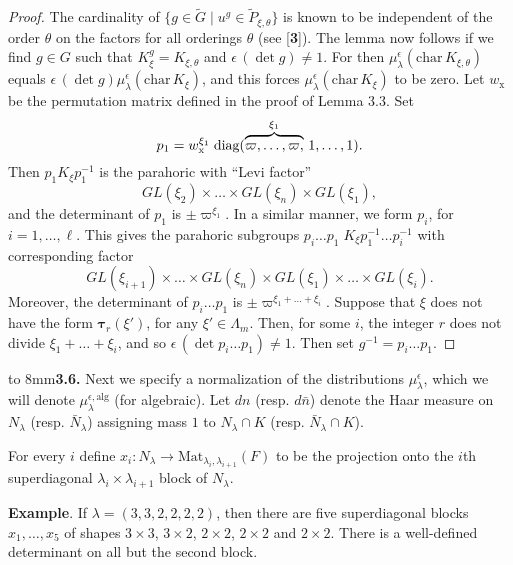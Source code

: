 \documentclass{amsart}
\begin{document}
\begin{proof}
The cardinality of
  $ \{ g \in \tilde G \mid u^g \in \tilde P_{\xi,\theta} \} $
is known to be independent of the order
  $ \theta $
on the factors for all orderings
  $ \theta $ (see [{\bf 3}]).
The lemma now follows if we find 
  $ g \in G $
such that
  $ K_{\xi}^g  = K_{\xi,\theta} $
and
  $ \epsilon \, (\det g) \neq 1 $.
For then 
%
$
   \mu_{\lambda}^{\epsilon} (\text{char}\,K_{\xi,\theta}) $
equals
    $ \epsilon \,(\det g) \mu_{\lambda}^{\epsilon} 
      (\text{char}\, K_{\xi})$, and this forces
    $\mu_{\lambda}^{\epsilon} (\text{char}\, K_{\xi})$ to be zero.
Let
  $ w_{\text{x}} $ be the permutation matrix defined in 
  the proof of Lemma 3.3.
Set
\[ 
  p_1 = w_{\text{x}}^{\xi_1} \; \text{diag} 
     ( 
      \overbrace{\vphantom{1}
         \varpi,\dots , \varpi,}^{\xi_1} \,1,\dots,1).\]
Then
  $ p_1 K_{\xi} p_1^{-1} $
is the parahoric with ``Levi factor''
$$
  GL(\xi_2) \times \dots \times 
  GL(\xi_n) \times
  GL(\xi_1),
$$
%
and the determinant of
  $ p_1 $ is
  $\pm\varpi^{\xi_1} $.
In a similar manner, we form
  $ p_i $,
  for $ i = 1, \dots , \ell $.
This gives the parahoric subgroups
  $ p_i \dots p_1 \;
    K_{\xi}
   p_1^{-1} \dots p_i^{-1} $
with corresponding factor
%
$$
  GL(\xi_{i+1})
  \times \dots \times
  GL(\xi_n) \times
  GL(\xi_1)
  \times \dots \times GL(\xi_i).
$$
%
Moreover, the determinant of 
  $ p_i \dots p_1 $ is
  $ \pm\varpi^{\xi_1 + \dots + \xi_i} $.
Suppose that $\xi$ does not have the form $\pmb\tau_r(\xi')$, for any $\xi'\in \Lambda_m$.
Then, for some $i$, the integer
  $ r$ does not divide $\xi_1 + \dots + \xi_i $,
and so
  $ \epsilon \, (\det p_i \dots p_1) \neq 1 $.
Then set
  $ g^{-1} = p_i \dots p_1 $.
%
\end{proof}

\bigskip
\noindent
\hbox to 8mm{{\bf 3.6.}\hfil}
Next we specify a normalization of the distributions
$ \mu_{\lambda}^{\epsilon} $,
which we will denote
  $ \mu_{\lambda}^{\epsilon, \text{alg}} $
(for algebraic).
Let
  $d n $
(resp. $d \bar n $)
denote the Haar measure on 
  $ N_{\lambda} $
(resp. $\bar N_{\lambda} $)
assigning mass $1$ to 
  $ N_{\lambda} \cap K $
(resp. $ \bar N_{\lambda} \cap K $).


For every $i$ define
  $ x_i : N_{\lambda} \to 
    \text{Mat}_{\lambda_i, \lambda_{i+1}} (F) $
to be the projection onto the $i$th superdiagonal
  $ \lambda_i \times \lambda_{i+1} $
block of 
  $ N_{\lambda} $.

\noindent
{\bf Example}.
If 
  $ \lambda = (3, 3, 2, 2, 2, 2) $,
then
there are five superdiagonal blocks $x_1,\ldots,x_5$ of shapes
$3\times 3$, $3\times 2$, $2\times 2$, $2\times 2$ and $2\times 2$.
There is a well-defined determinant on all but the second block.
\end{document}
